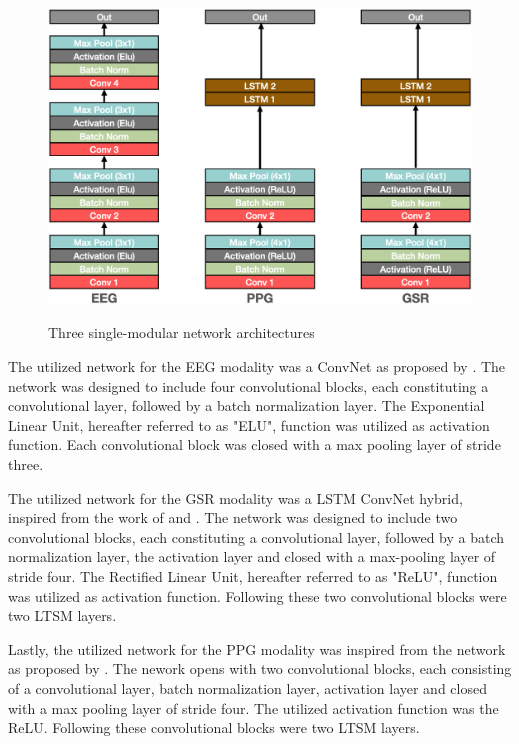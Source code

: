 \documentclass[12pt]{article}
\begin{document}
\begin{figure}
\caption{Three single-modular network architectures}
\bigskip
\includegraphics[scale=0.725]{single_model_architecture}
\label{fig:singlearchitecture}
\end{figure}

The utilized network for the EEG modality was a ConvNet as proposed by . The network was designed to include four convolutional blocks, each constituting a convolutional layer, followed by a batch normalization layer. The Exponential Linear Unit, hereafter referred to as "ELU", function was utilized as activation function. Each convolutional block was closed with a max pooling layer of stride three.

The utilized network for the GSR modality was a LSTM ConvNet hybrid, inspired from the work of  and . The network was designed to include two convolutional blocks, each constituting a convolutional layer, followed by a batch normalization layer, the activation layer and closed with a max-pooling layer of stride four. The Rectified Linear Unit, hereafter referred to as "ReLU", function was utilized as activation function. Following these two convolutional blocks were two LTSM layers.

Lastly, the utilized network for the PPG modality was inspired from the network as proposed by . The nework opens with two convolutional blocks, each consisting of a convolutional layer, batch normalization layer, activation layer and closed with a max pooling layer of stride four. The utilized activation function was the ReLU. Following these convolutional blocks were two LTSM layers.
\end{document}
